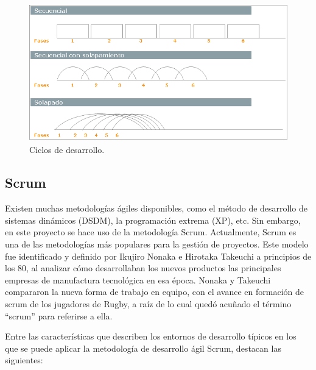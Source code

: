 \begin{figure}[t!]
\centering
\includegraphics[width=12cm,height=6cm]{figuras/ciclos_desarrollo.png}
\caption{Ciclos de desarrollo.}
\label{fig:ciclos}
\end{figure}

\subsection{Scrum} \label{scrum}
Existen muchas metodologías ágiles disponibles, como el método de desarrollo de sistemas dinámicos (DSDM), la programación extrema (XP), etc. Sin embargo, en este proyecto se hace uso de la metodología Scrum. Actualmente, Scrum es una de las metodologías más populares para la gestión de proyectos. Este modelo fue identificado y definido por Ikujiro Nonaka e Hirotaka Takeuchi a principios de los 80, al analizar cómo desarrollaban los nuevos productos las principales empresas de manufactura tecnológica en esa época. Nonaka y Takeuchi compararon la nueva forma de trabajo en equipo, con el avance en formación de scrum de los jugadores de Rugby, a raíz de lo cual quedó acuñado el término “scrum” para referirse a ella.

Entre las características que describen los entornos de desarrollo típicos en los que se puede aplicar la metodología de desarrollo ágil Scrum, destacan las siguientes:

